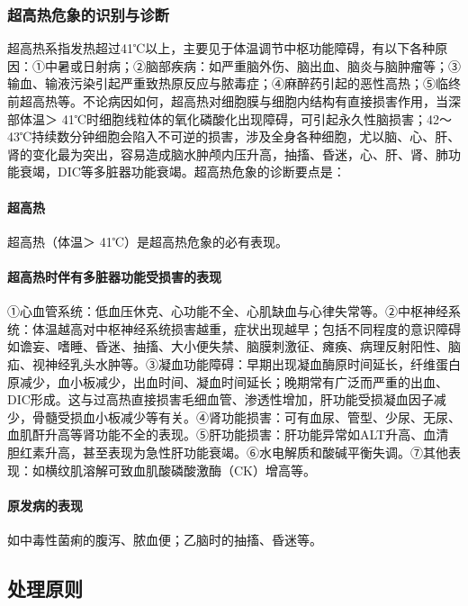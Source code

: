 \subsubsection{超高热危象的识别与诊断}

超高热系指发热超过41℃以上，主要见于体温调节中枢功能障碍，有以下各种原因：①中暑或日射病；②脑部疾病：如严重脑外伤、脑出血、脑炎与脑肿瘤等；③输血、输液污染引起严重致热原反应与脓毒症；④麻醉药引起的恶性高热；⑤临终前超高热等。不论病因如何，超高热对细胞膜与细胞内结构有直接损害作用，当深部体温＞
41℃时细胞线粒体的氧化磷酸化出现障碍，可引起永久性脑损害；42～43℃持续数分钟细胞会陷入不可逆的损害，涉及全身各种细胞，尤以脑、心、肝、肾的变化最为突出，容易造成脑水肿颅内压升高，抽搐、昏迷，心、肝、肾、肺功能衰竭，DIC等多脏器功能衰竭。超高热危象的诊断要点是：

\paragraph{超高热}

超高热（体温＞ 41℃）是超高热危象的必有表现。

\paragraph{超高热时伴有多脏器功能受损害的表现}

①心血管系统：低血压休克、心功能不全、心肌缺血与心律失常等。②中枢神经系统：体温越高对中枢神经系统损害越重，症状出现越早；包括不同程度的意识障碍如谵妄、嗜睡、昏迷、抽搐、大小便失禁、脑膜刺激征、瘫痪、病理反射阳性、脑疝、视神经乳头水肿等。③凝血功能障碍：早期出现凝血酶原时间延长，纤维蛋白原减少，血小板减少，出血时间、凝血时间延长；晚期常有广泛而严重的出血、DIC形成。这与过高热直接损害毛细血管、渗透性增加，肝功能受损凝血因子减少，骨髓受损血小板减少等有关。④肾功能损害：可有血尿、管型、少尿、无尿、血肌酐升高等肾功能不全的表现。⑤肝功能损害：肝功能异常如ALT升高、血清胆红素升高，甚至表现为急性肝功能衰竭。⑥水电解质和酸碱平衡失调。⑦其他表现：如横纹肌溶解可致血肌酸磷酸激酶（CK）增高等。

\paragraph{原发病的表现}

如中毒性菌痢的腹泻、脓血便；乙脑时的抽搐、昏迷等。

\subsection{处理原则}

